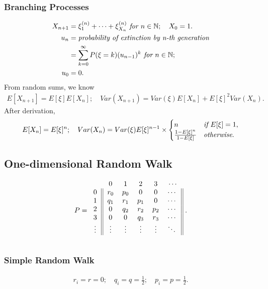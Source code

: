 \documentclass{article}
\begin{document}
\subsubsection{Branching Processes}
\begin{align*}
    X_{n+1} & = \xi_1^{(n)} + \dots + \xi_{X_n}^{(n)} \emph{ for } n\in \mathbb{N}; \quad X_0 = 1. \\
    u_n & = \emph{probability of extinction by n-th generation} \\
    & = \sum_{k=0}^{\infty}P(\xi = k)(u_{n-1})^k \emph{ for } n\in \mathbb{N}; \\
    u_0 & = 0.
\end{align*}
From random sums, we know
\begin{align*}
    E[X_{n+1}] = E[\xi]E[X_{n}]; \quad Var(X_{n+1}) = Var(\xi)E[X_n] + E[\xi]^2Var(X_n).
\end{align*}
After derivation, 
\begin{align*}
    E[X_n] = E[\xi]^n; \quad Var(X_n) = Var(\xi)E[\xi]^{n-1}\times \begin{cases}
        n & \emph{if } E[\xi] = 1, \\
        \frac{1-E[\xi]^n}{1-E[\xi]} & \emph{otherwise}.
    \end{cases}
\end{align*}
    
\subsection{One-dimensional Random Walk}
\begin{align*}
    P = 
    \begin{blockarray}{cccccc}
        & 0 & 1 & 2 & 3 & \cdots \\
        \begin{block}{c||ccccc||}
            0 & r_0 & p_0 & 0 & 0 & \cdots \\
            1 & q_1 & r_1 & p_1 & 0 & \cdots \\
            2 & 0 & q_2 & r_2 & p_2 & \cdots \\
            3 & 0 & 0 & q_3 & r_3 & \cdots \\
            \vdots & \vdots & \vdots & \vdots & \vdots & \ddots \\
        \end{block} 
    \end{blockarray}\; .
\end{align*}

\subsubsection{Simple Random Walk}
\begin{align*}
    r_i = r = 0; \quad q_i = q = \frac{1}{2}; \quad p_i = p = \frac{1}{2}.
\end{align*}
\end{document}
